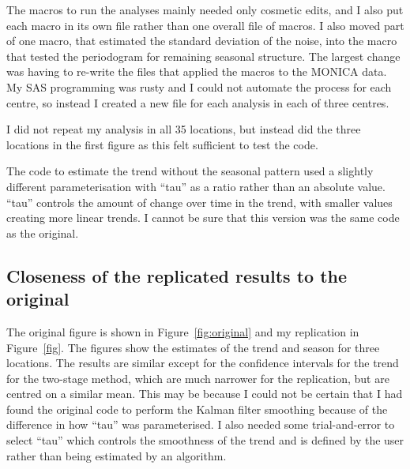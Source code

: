 The macros to run the analyses mainly needed only cosmetic edits, and I also put each macro in its own file rather than one overall file of macros. I also moved part of one macro, that estimated the standard deviation of the noise, into the macro that tested the periodogram for remaining seasonal structure. The largest change was having to re-write the files that applied the macros to the MONICA data. My SAS programming was rusty and I could not automate the process for each centre, so instead I created a new file for each analysis in each of three centres.

I did not repeat my analysis in all 35 locations, but instead did the three locations in the first figure as this felt sufficient to test the code.

The code to estimate the trend without the seasonal pattern used a slightly different parameterisation with ``tau'' as a ratio rather than an absolute value. ``tau'' controls the amount of change over time in the trend, with smaller values creating more linear trends. I cannot be sure that this version was the same code as the original.

\subsection{Closeness of the replicated results to the original}

The original figure is shown in Figure~\ref{fig:original} and my replication in Figure~\ref{fig}. The figures show the estimates of the trend and season for three locations.
The results are similar except for the confidence intervals for the trend for the two-stage method, which are much narrower for the replication, but are centred on a similar mean.
This may be because I could not be certain that I had found the original code to perform the Kalman filter smoothing because of the difference in how ``tau'' was parameterised. 
I also needed some trial-and-error to select ``tau'' which controls the smoothness of the trend and is defined by the user rather than being estimated by an algorithm.


